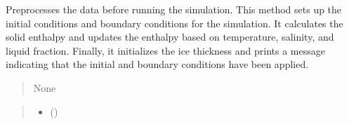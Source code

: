 \documentclass[a4paper,11pt,english,openany]{sphinxmanual}
\begin{document}
\begin{fulllineitems}
\begin{fulllineitems}
\begin{quote}
\begin{description}
\end{description}\end{quote}

\end{fulllineitems}


\begin{fulllineitems}
\label{\detokenize{api/spyice.preprocess.pre_process:spyice.preprocess.pre_process.PreProcess.preprocess}}
\pysigstartsignatures
{}
\pysigstopsignatures
\sphinxAtStartPar
Preprocesses the data before running the simulation.
This method sets up the initial conditions and boundary conditions for the simulation.
It calculates the solid enthalpy and updates the enthalpy based on temperature, salinity, and liquid fraction.
Finally, it initializes the ice thickness and prints a message indicating that the initial and boundary conditions have been applied.
\begin{quote}
\begin{description}
\sphinxAtStartPar
None

\end{description}
\end{quote}

\end{fulllineitems}


\begin{fulllineitems}
\label{\detokenize{api/spyice.preprocess.pre_process:spyice.preprocess.pre_process.PreProcess.set_dataclass}}
\pysigstartsignatures
{}
\pysigstopsignatures\begin{quote}\begin{description}
\begin{itemize}
\item {} 
\sphinxAtStartPar
{} ()


\end{itemize}
\end{description}
\end{quote}
\end{fulllineitems}
\end{fulllineitems}
\end{document}
